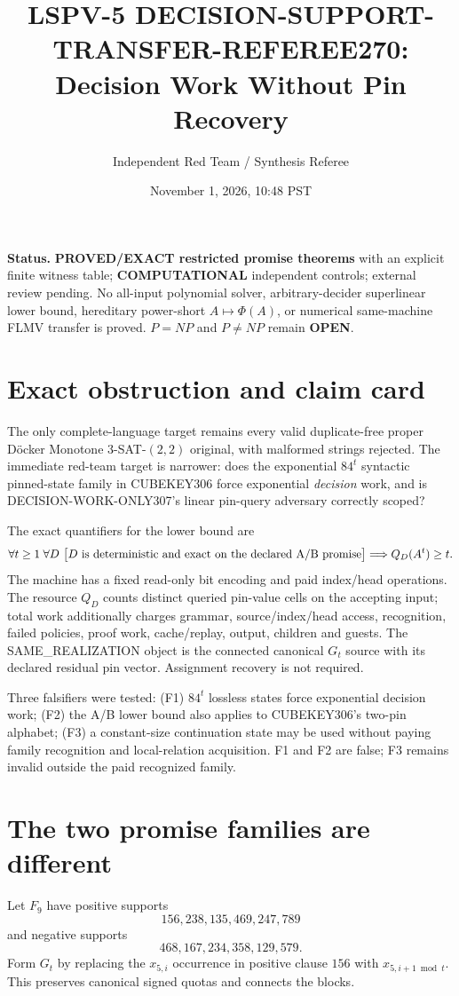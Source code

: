 \documentclass[11pt]{article}
\title{LSPV-5 DECISION-SUPPORT-TRANSFER-REFEREE270:\\Decision Work Without Pin Recovery}
\author{Independent Red Team / Synthesis Referee}
\date{November 1, 2026, 10:48 PST}
\begin{document}
\maketitle

\noindent\textbf{Status.} \textbf{PROVED/EXACT restricted promise theorems} with an explicit finite witness table; \textbf{COMPUTATIONAL} independent controls; external review pending.  No all-input polynomial solver, arbitrary-decider superlinear lower bound, hereditary power-short $A\mapsto\Phi(A)$, or numerical same-machine FLMV transfer is proved.  $P=NP$ and $P\ne NP$ remain \textbf{OPEN}.

\section{Exact obstruction and claim card}
The only complete-language target remains every valid duplicate-free proper D\"ocker Monotone $3$-SAT-$(2,2)$ original, with malformed strings rejected.  The immediate red-team target is narrower: does the exponential $84^t$ syntactic pinned-state family in CUBEKEY306 force exponential \emph{decision} work, and is DECISION-WORK-ONLY307's linear pin-query adversary correctly scoped?

The exact quantifiers for the lower bound are
\[
 \forall t\ge1\;\forall D\ \bigl[D\hbox{ is deterministic and exact on the declared A/B promise}\bigr]
 \Longrightarrow Q_D(A^t)\ge t.
\]
The machine has a fixed read-only bit encoding and paid index/head operations.  The resource $Q_D$ counts distinct queried pin-value cells on the accepting input; total work additionally charges grammar, source/index/head access, recognition, failed policies, proof work, cache/replay, output, children and guests.  The SAME\_REALIZATION object is the connected canonical $G_t$ source with its declared residual pin vector.  Assignment recovery is not required.

Three falsifiers were tested: (F1) $84^t$ lossless states force exponential decision work; (F2) the A/B lower bound also applies to CUBEKEY306's two-pin alphabet; (F3) a constant-size continuation state may be used without paying family recognition and local-relation acquisition.  F1 and F2 are false; F3 remains invalid outside the paid recognized family.

\section{The two promise families are different}
Let $F_9$ have positive supports
\[
156,238,135,469,247,789
\]
and negative supports
\[
468,167,234,358,129,579.
\]
Form $G_t$ by replacing the $x_{5,i}$ occurrence in positive clause $156$ with $x_{5,i+1\bmod t}$.  This preserves canonical signed quotas and connects the blocks.
\end{document}
